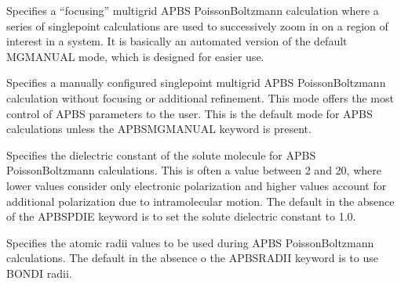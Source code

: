 \documentclass[letterpaper,11pt,english]{sphinxmanual}
\begin{document}
\ignorespaces {}\label{\detokenize{text/keywords:key-apbs-mg-auto}}\begin{description}
\sphinxAtStartPar
Specifies a “focusing” multigrid APBS Poisson\sphinxhyphen{}Boltzmann calculation where a series of single\sphinxhyphen{}point calculations are used to successively zoom in on a region of interest in a system. It is basically an automated version of the default MG\sphinxhyphen{}MANUAL mode, which is designed for easier use.

\end{description}

\ignorespaces {}\label{\detokenize{text/keywords:key-apbs-mg-manual}}\begin{description}
\sphinxAtStartPar
Specifies a manually configured single\sphinxhyphen{}point multigrid APBS Poisson\sphinxhyphen{}Boltzmann calculation without focusing or additional refinement. This mode offers the most control of APBS parameters to the user. This is the default mode for APBS calculations unless the APBS\sphinxhyphen{}MG\sphinxhyphen{}MANUAL keyword is present.

\end{description}

\ignorespaces {}\label{\detokenize{text/keywords:key-apbs-pdie}}\begin{description}
\sphinxAtStartPar
Specifies the dielectric constant of the solute molecule for APBS Poisson\sphinxhyphen{}Boltzmann calculations. This is often a value between 2 and 20, where lower values consider only electronic polarization and higher values account for additional polarization due to intramolecular motion. The default in the absence of the APBS\sphinxhyphen{}PDIE keyword is to set the solute dielectric constant to 1.0.

\end{description}

\ignorespaces {}\label{\detokenize{text/keywords:key-apbs-radii}}\begin{description}
\sphinxAtStartPar
Specifies the atomic radii values to be used during APBS Poisson\sphinxhyphen{}Boltzmann calculations. The default in the absence o the APBS\sphinxhyphen{}RADII keyword is to use BONDI radii.

\end{description}
\end{document}
